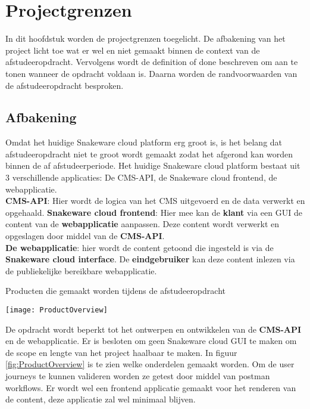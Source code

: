 \chapter{Projectgrenzen}
In dit hoofdstuk worden de projectgrenzen toegelicht.
De afbakening van het project licht toe wat er wel en niet gemaakt binnen de context van de afstudeeropdracht.
Vervolgens wordt de definition of done beschreven om aan te tonen wanneer de opdracht voldaan is.
Daarna worden de randvoorwaarden van de afstudeeropdracht besproken.
\section{Afbakening}
Omdat het huidige Snakeware cloud platform erg groot is, is het belang dat afstudeeropdracht niet te groot wordt gemaakt zodat het afgerond kan worden binnen de af afstudeerperiode.
Het huidige Snakeware cloud platform bestaat uit 3 verschillende applicaties: De \gls{CMS}-API, de Snakeware cloud frontend, de webapplicatie.\\
\textbf{CMS-API}: Hier wordt de logica van het CMS uitgevoerd en de data verwerkt en opgehaald.
\textbf{Snakeware cloud frontend}: Hier mee kan de \textbf{klant} via een \gls{GUI} de content van de \textbf{webapplicatie} aanpassen.
Deze content wordt verwerkt en opgeslagen door middel van de \textbf{\gls{CMS}-API}.\\
\textbf{De webapplicatie}: hier wordt de content getoond die ingesteld is via de \textbf{Snakeware cloud interface}.
De \textbf{eindgebruiker} kan deze content inlezen via de publiekelijke bereikbare webapplicatie. \\
\begin{graphic}
    \vspace{0.2cm}
    \captionsetup{type=figure}
    \caption{Producten die gemaakt worden tijdens de afstudeeropdracht}
    \texttt{[image: ProductOverview]}
    \label{fig:ProductOverview}
    \vspace{0.2cm}
\end{graphic}

\whitespace[2]
De opdracht wordt beperkt tot het ontwerpen en ontwikkelen van de \textbf{\gls{CMS}-API} en de webapplicatie.
Er is besloten om geen Snakeware cloud \gls{GUI} te maken om de scope en lengte van het project haalbaar te maken.
In figuur \ref{fig:ProductOverview} is te zien welke onderdelen gemaakt worden.
Om de user journeys te kunnen valideren worden ze getest door middel van postman workflows.
Er wordt wel een frontend applicatie gemaakt voor het renderen van de content, deze applicatie zal wel minimaal blijven.

